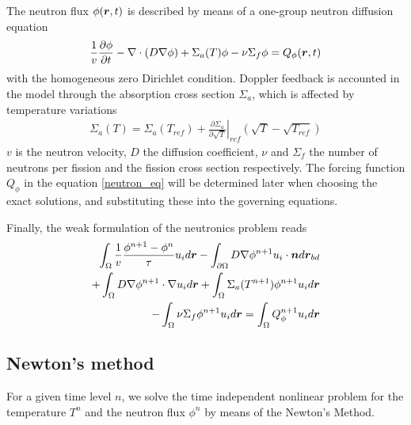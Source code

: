 The neutron flux $\phi(\boldsymbol{r},t)$ is described by means of a  one-group neutron diffusion equation
\begin{align}
  \frac{1}{v} \frac{\partial\phi}{\partial t} 
  - \nabla\cdot(D \nabla \phi) 
  + \Sigma_{a}(T) \phi 
  - \nu \Sigma_{f} \phi
  = Q_{\phi}(\boldsymbol{r},t) \label{neutron_eq}
\end{align}
%
with the homogeneous zero Dirichlet condition. Doppler feedback is accounted in the model through the absorption cross section $\Sigma_{a}$, which is affected by temperature variations
\begin{align}
  \Sigma_{a}(T) = \Sigma_{a}(T_{ref}) 
  + \left. \frac{\partial \Sigma_{a}}{\partial \sqrt{T}}\right|_{ref} 
    \left( \sqrt{T} - \sqrt{T_{ref}} \right)
\end{align}
%
$v$ is the neutron velocity, $D$ the diffusion coefficient, $\nu$ and $\Sigma_{f}$ the number of neutrons per fission and the fission cross section respectively.  The forcing function $Q_{\phi}$ in the equation \eqref{neutron_eq} will be determined later when choosing the exact solutions, and substituting these into the governing equations.

Finally, the weak formulation of the neutronics problem reads
\begin{align}
  \int_{\Omega} \frac{1}{v} \frac{\phi^{n+1}-\phi{^n}}{\tau} u_i d\boldsymbol{r} 
  - \int_{\partial\Omega} D \nabla \phi^{n+1} u_i \cdot \boldsymbol{n} d\boldsymbol{r}_{bd}& \nonumber \\
  + \int_{\Omega} D \nabla \phi^{n+1} \cdot \nabla u_i d\boldsymbol{r} 
  + \int_{\Omega} \Sigma_{a}(T^{n+1}) \phi^{n+1} u_i d\boldsymbol{r}& \nonumber \\
  - \int_{\Omega} \nu \Sigma_{f} \phi^{n+1} u_i d\boldsymbol{r} 
  = \int_{\Omega} Q_{\phi}^{n+1} u_i d\boldsymbol{r}&
\end{align}


\subsection*{Newton's method}
For a given time level $n$, we solve the time independent nonlinear problem for the temperature $T^{n}$ and the neutron flux $\phi^{n}$ by means of the Newton's Method.

